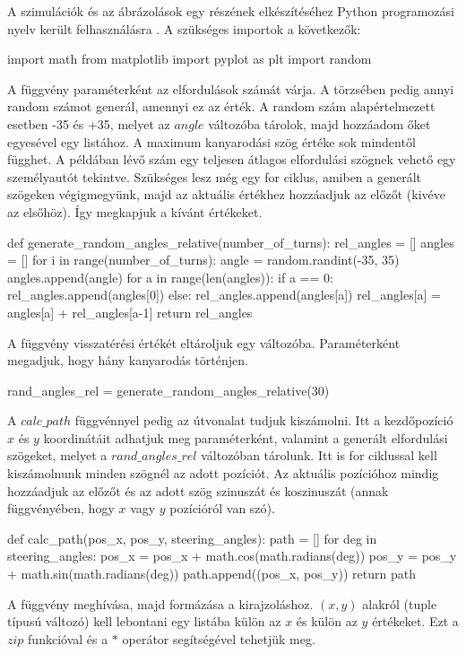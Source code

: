 A szimulációk és az ábrázolások egy részének elkészítéséhez Python programozási nyelv került felhasználásra \cite{Python}.
A szükséges importok a következők:
\begin{python}
import math
from matplotlib import pyplot as plt
import random
\end{python}
A függvény paraméterként az elfordulások számát várja. A törzsében pedig annyi random számot generál, amennyi ez az érték. A random szám alapértelmezett esetben -35 és +35, melyet az $ angle $ változóba tárolok, majd hozzáadom őket egyesével egy listához. A maximum kanyarodási szög értéke sok mindentől függhet. A példában lévő szám egy teljesen átlagos elfordulási szögnek vehető egy személyautót tekintve. Szükséges lesz még egy for ciklus, amiben a generált szögeken végigmegyünk, majd az aktuális értékhez hozzáadjuk az előzőt (kivéve az elsőhöz). Így megkapjuk a kívánt értékeket.
\begin{python}
def generate_random_angles_relative(number_of_turns):
    rel_angles = []
    angles = []
    for i in range(number_of_turns):
        angle = random.randint(-35, 35)
        angles.append(angle)
    for a in range(len(angles)):
        if a == 0:
            rel_angles.append(angles[0])
        else:
            rel_angles.append(angles[a])
            rel_angles[a] = angles[a] + rel_angles[a-1]
    return rel_angles
\end{python}
A függvény visszatérési értékét eltároljuk egy változóba. Paraméterként megadjuk, hogy hány kanyarodás történjen.
\begin{python}
rand_angles_rel = generate_random_angles_relative(30)
\end{python}
A $calc\_path$ függvénnyel pedig az útvonalat tudjuk kiszámolni. Itt a kezdőpozíció $ x $ és $ y $ koordinátáit adhatjuk meg paraméterként, valamint a generált elfordulási szögeket, melyet a $rand\_angles\_rel$ változóban tárolunk. Itt is for ciklussal kell kiszámolnunk minden szögnél az adott pozíciót. Az aktuális pozícióhoz mindig hozzáadjuk az előzőt és az adott szög szinuszát és koszinuszát (annak függvényében, hogy $ x $ vagy $ y $ pozícióról van szó). 
\begin{python}
def calc_path(pos_x, pos_y, steering_angles):
    path = []
    for deg in steering_angles:
        pos_x = pos_x + math.cos(math.radians(deg))
        pos_y = pos_y + math.sin(math.radians(deg))
        path.append((pos_x, pos_y))
    return path
\end{python}
A függvény meghívása, majd formázása a kirajzoláshoz. $ (x, y) $ alakról (tuple típusú változó) kell lebontani egy listába külön az $ x $ és külön az $ y $ értékeket. Ezt a $ zip $ funkcióval és a $ * $ operátor segítségével tehetjük meg.
